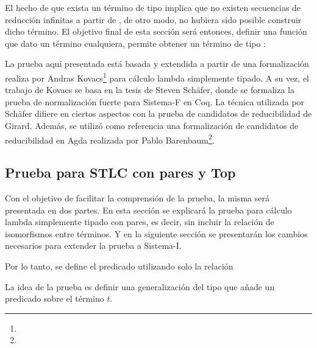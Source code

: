 \documentclass[]{report}
\begin{document}
	El hecho de que exista un término de tipo   implica que no existen secuencias de reducción infinitas a partir de , de otro modo, no hubiera sido posible construir dicho término.
	El objetivo final de esta sección será entonces, definir una función que dato un término cualquiera, permite obtener un término de tipo  :
	
	\AgdaSpace{}%
	\AgdaSymbol{:}\AgdaSpace{}%
	\AgdaSpace{}%
	\AgdaSymbol{\{}\AgdaSpace{}%
	\AgdaSymbol{\}}\AgdaSpace{}%
	\AgdaSymbol{(}\AgdaSpace{}%
	\AgdaSymbol{:}\AgdaSpace{}%
	\AgdaSpace{}%
	\AgdaSpace{}%
	\AgdaSymbol{)}\AgdaSpace{}%
	\AgdaSpace{}%
	\AgdaSpace{}%
	
	La prueba aquí presentada está basada y extendida a partir de una formalización realiza por 
	Andras Kovacs\footnote{} para cálculo lambda simplemente tipado.
	A su vez, el trabajo de Kovacs se basa en la tesis de Steven Schäfer\cite{Schafer}, donde se formaliza la prueba de normalización fuerte para Sistema-F en Coq.
	La técnica utilizada por Schäfer difiere en ciertos aspectos con la prueba de candidatos de reducibilidad de Girard\cite{Girard}.
	Además, se utilizó como referencia una formalización de candidatos de reducibilidad en Agda realizada por Pablo Barenbaum\footnote{}.
	
	\subsection{Prueba para STLC con pares y Top}
	
	Con el objetivo de facilitar la comprensión de la prueba, la misma será presentada en dos partes.
	En esta sección se explicará la prueba para cálculo lambda simplemente tipado con pares, es decir, sin incluir la relación de isomorfismos entre términos.
	Y en la siguiente sección se presentarán los cambios necesarios para extender la prueba a Sistema-I.
	
	
	Por lo tanto, se define el predicado  utilizando solo la relación \AgdaDatatype{$\_\hookrightarrow\_$}

	
	La idea de la prueba es definir una generalización del tipo  que añade un predicado sobre el término $t$.
	
\end{document}

